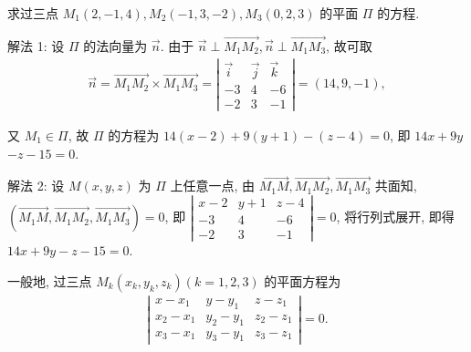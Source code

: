 \begin{example}
	求过三点 $M_1(2,-1,4), M_2(-1,3,-2), M_3(0,2,3)$ 的平面 $\Pi$ 的方程.
\end{example}
\begin{solution}
	解法 1: 设 $\Pi$ 的法向量为 $\vec{n}$. 由于 $\vec{n} \perp \overrightarrow{M_1 M_2}, \vec{n} \perp \overrightarrow{M_1 M_3}$, 故可取
	\begin{align*}
		\vec{n}=\overrightarrow{M_1 M_2} \times \overrightarrow{M_1 M_3}=\left|\begin{array}{ccc}
			                                                                       \vec{i} & \vec{j} & \vec{k} \\
			                                                                       -3      & 4       & -6      \\
			                                                                       -2      & 3       & -1
		                                                                       \end{array}\right|=(14,9,-1),
	\end{align*}

	又 $M_1 \in \Pi$, 故 $\Pi$ 的方程为 $14(x-2)+9(y+1)-(z-4)=0$, 即 $14 x+9 y$ $-z-15=0$.

	解法 2: 设 $M(x, y, z)$ 为 $\Pi$ 上任意一点, 由 $\overrightarrow{M_1 M} ,  \overrightarrow{M_1 M_2}, \overrightarrow{M_1 M_3}$ 共面知, $\left(\overrightarrow{M_1 M}, \overrightarrow{M_1 M_2}, \overrightarrow{M_1 M_3}\right)=0$, 即 $\left|\begin{array}{ccc}x-2 & y+1 & z-4 \\ -3 & 4 & -6 \\ -2 & 3 & -1\end{array}\right|=0$, 将行列式展开, 即得 $14 x+9 y-z-15=0$.
\end{solution}
\begin{note}
	一般地, 过三点 $M_k\left(x_k, y_k, z_k\right)(k=1,2,3)$ 的平面方程为
	\begin{align*}
		\left|\begin{array}{ccc}
			      x-x_1   & y-y_1   & z-z_1   \\
			      x_2-x_1 & y_2-y_1 & z_2-z_1 \\
			      x_3-x_1 & y_3-y_1 & z_3-z_1
		      \end{array}\right|=0 .
	\end{align*}
\end{note}

